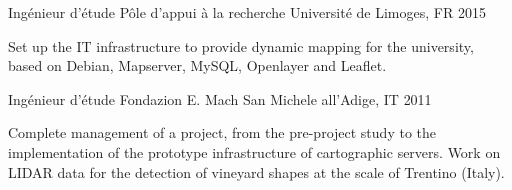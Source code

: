 \begin{cventries}
\cventry
  {Ingénieur d'étude} %
  {Pôle d'appui à la recherche} %
  {Université de Limoges, FR} %
  {2015} %
  {
    \begin{cvitems} %
    Set up the IT infrastructure to provide dynamic mapping for the university, based on Debian, Mapserver, MySQL, Openlayer and Leaflet.
    \end{cvitems}
  }

\cventry
  {Ingénieur d'étude} %
  {Fondazion E. Mach} %
  {San Michele all'Adige, IT} %
  {2011} %
  {
    \begin{cvitems} %
    Complete management of a project, from the pre-project study to the implementation of the prototype infrastructure of cartographic servers. Work on LIDAR data for the detection of vineyard shapes at the scale of Trentino (Italy).
    \end{cvitems}
  }


\end{cventries}
